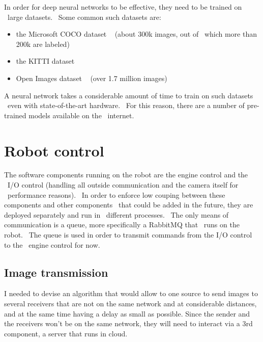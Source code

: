 In order for deep neural networks to be effective, they need to be trained on \
large datasets. \
Some common such datasets are:
\begin{itemize}
    \item the Microsoft COCO dataset ~\cite{COCO} (about 300k images, out of \
            which more than 200k are labeled)
    \item the KITTI dataset ~\cite{kitti}
    \item Open Images dataset ~\cite{openimages} (over 1.7 million images)
\end{itemize}

A neural network takes a considerable amount of time to train on such datasets \
even with state-of-the-art hardware. \
For this reason, there are a number of pre-trained models available on the \
internet.


\section{Robot control}
\label{sec:analysis-robot-control}
The software components running on the robot are the engine control and the \
I/O control (handling all outside communication and the camera itself for \
performance reasons). \
In order to enforce low couping between these components and other components \
that could be added in the future, they are deployed separately and run in \
different processes. \
The only means of communication is a queue, more specifically a RabbitMQ that \
runs on the robot. \
The queue is used in order to transmit commands from the I/O control to the \
engine control for now.


\subsection{Image transmission}
\label{subsec:analysis-image-transmission}
 I needed to devise an algorithm that would allow to one source to send images to several receivers that are
 not on the same network and at considerable distances, and at the same time having a delay as small as possible.
 Since the sender and the receivers won't be on the same network, they will need to interact via a 3rd component,
 a server that runs in cloud.

